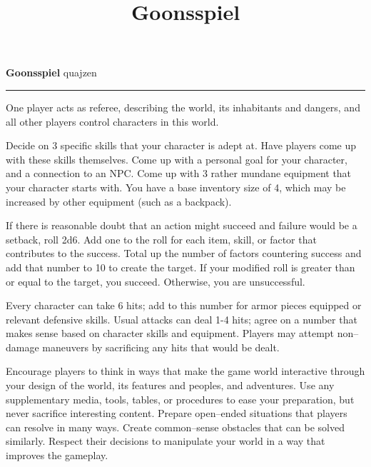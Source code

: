 \documentclass{article}
\title{Goonsspiel}
\begin{document}
{\centering \Large \textbf{Goonsspiel}} \hfill quajzen \hrule

\begin{multicols}{2}

  
  One player acts as referee, describing the world, its inhabitants and dangers, and all other players control characters in this world. \\


  Decide on 3 specific skills that your character is adept at.
  Have players come up with these skills themselves.
  Come up with a personal goal for your character, and a connection to an NPC.
  Come up with 3 rather mundane equipment that your character starts with.
  You have a base inventory size of 4, which may be increased by other equipment (such as a backpack). \\


  If there is reasonable doubt that an action might succeed and failure would be a setback, roll 2d6.
  Add one to the roll for each item, skill, or factor that contributes to the success.
  Total up the number of factors countering success and add that number to 10 to create the target.
  If your modified roll is greater than or equal to the target, you succeed.
  Otherwise, you are unsuccessful. \\


  Every character can take 6 hits; add to this number for armor pieces equipped or relevant defensive skills.
  Usual attacks can deal 1-4 hits; agree on a number that makes sense based on character skills and equipment.
  Players may attempt non--damage maneuvers by sacrificing any hits that would be dealt. \\
  


  Encourage players to think in ways that make the game world interactive through your design of the world, its features and peoples, and adventures.
  Use any supplementary media, tools, tables, or procedures to ease your preparation, but never sacrifice interesting content.
  Prepare open--ended situations that players can resolve in many ways.
  Create common--sense obstacles that can be solved similarly.
  Respect their decisions to manipulate your world in a way that improves the gameplay. \\


\end{multicols}
\end{document}
